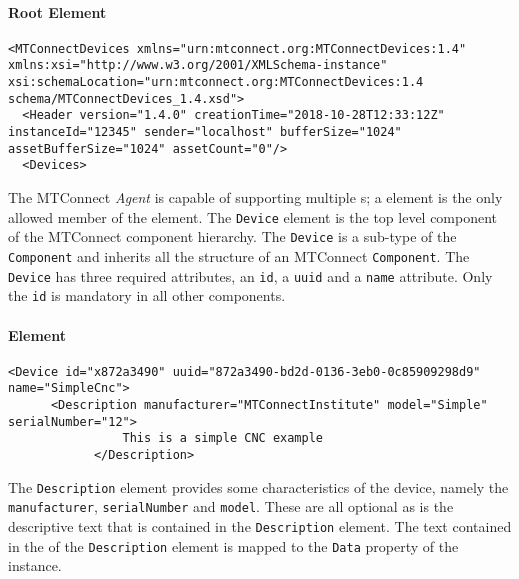 \paragraph{ Root Element}

\begin{lstlisting}[caption={Device Header},label={lst:device-header}]
<MTConnectDevices xmlns="urn:mtconnect.org:MTConnectDevices:1.4" xmlns:xsi="http://www.w3.org/2001/XMLSchema-instance" xsi:schemaLocation="urn:mtconnect.org:MTConnectDevices:1.4 schema/MTConnectDevices_1.4.xsd">
  <Header version="1.4.0" creationTime="2018-10-28T12:33:12Z" instanceId="12345" sender="localhost" bufferSize="1024" assetBufferSize="1024" assetCount="0"/>
  <Devices>
\end{lstlisting}

The MTConnect \textit{Agent} is capable of supporting multiple s; a  element is the only allowed member of the  element. The \texttt{Device} element is the top level component of the MTConnect component hierarchy. The \texttt{Device} is a sub-type of the \texttt{Component} and inherits all the structure of an MTConnect \texttt{Component}. The \texttt{Device} has three required attributes, an \texttt{id}, a \texttt{uuid} and a \texttt{name} attribute. Only the \texttt{id} is mandatory in all other components. 

\paragraph{ Element}


\begin{lstlisting}[firstnumber=last,%
    caption={\texttt{Device} Element Mapping},label={lst:device-model-device}]
    <Device id="x872a3490" uuid="872a3490-bd2d-0136-3eb0-0c85909298d9" name="SimpleCnc">
      <Description manufacturer="MTConnectInstitute" model="Simple" serialNumber="12">
				This is a simple CNC example
			</Description>
\end{lstlisting}

The \texttt{Description} element provides some characteristics of the device, namely the \texttt{manufacturer}, \texttt{serialNumber} and \texttt{model}. These are all optional as is the descriptive text that is contained in the \texttt{Description} element. The text contained in the  of the \texttt{Description} element is mapped to the \texttt{Data} property of the  instance.

